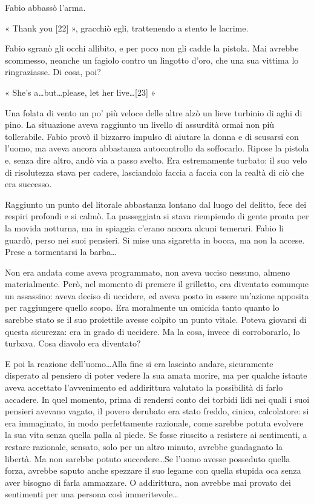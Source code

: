 Fabio abbassò l'arma.

« Thank you [22] », gracchiò egli, trattenendo a stento le lacrime.

Fabio sgranò gli occhi allibito, e per poco non gli cadde la pistola. Mai avrebbe scommesso, neanche un fagiolo contro un lingotto d'oro, che una sua vittima lo ringraziasse. Di cosa, poi?

« She's a\ldots but\ldots please, let her live\ldots [23] »

Una folata di vento un po' più veloce delle altre alzò un lieve turbinio di aghi di pino. La situazione aveva raggiunto un livello di assurdità ormai non più tollerabile. Fabio provò il bizzarro impulso di aiutare la donna e di scusarsi con l'uomo, ma aveva ancora abbastanza autocontrollo da soffocarlo. Ripose la pistola e, senza dire altro, andò via a passo svelto. Era estremamente turbato: il suo velo di risolutezza stava per cadere, lasciandolo faccia a faccia con la realtà di ciò che era successo.

Raggiunto un punto del litorale abbastanza lontano dal luogo del delitto, fece dei respiri profondi e si calmò. La passeggiata si stava riempiendo di gente pronta per la movida notturna, ma in spiaggia c'erano ancora alcuni temerari. Fabio li guardò, perso nei suoi pensieri. Si mise una sigaretta in bocca, ma non la accese. Prese a tormentarsi la barba\ldots

Non era andata come aveva programmato, non aveva ucciso nessuno, almeno materialmente. Però, nel momento di premere il grilletto, era diventato comunque un assassino: aveva deciso di uccidere, ed aveva posto in essere un'azione apposita per raggiungere quello scopo. Era moralmente un omicida tanto quanto lo sarebbe stato se il suo proiettile avesse colpito un punto vitale. Poteva giovarsi di questa sicurezza: era in grado di uccidere. Ma la cosa, invece di corroborarlo, lo turbava. Cosa diavolo era diventato?

E poi la reazione dell'uomo\ldots Alla fine si era lasciato andare, sicuramente disperato al pensiero di poter vedere la sua amata morire, ma per qualche istante aveva accettato l'avvenimento ed addirittura valutato la possibilità di farlo accadere. In quel momento, prima di rendersi conto dei torbidi lidi nei quali i suoi pensieri avevano vagato, il povero derubato era stato freddo, cinico, calcolatore: si era immaginato, in modo perfettamente razionale, come sarebbe potuta evolvere la sua vita senza quella palla al piede. Se fosse riuscito a resistere ai sentimenti, a restare razionale, sensato, solo per un altro minuto, avrebbe guadagnato la libertà. Ma non sarebbe potuto succedere\ldots Se l'uomo avesse posseduto quella forza, avrebbe saputo anche spezzare il suo legame con quella stupida oca senza aver bisogno di farla ammazzare. O addirittura, non avrebbe mai provato dei sentimenti per una persona così immeritevole\ldots

